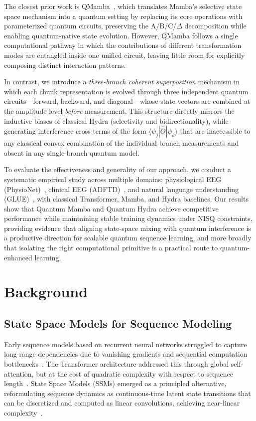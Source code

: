 \documentclass[conference]{IEEEtran}
\begin{document}
The closest prior work is QMamba~\cite{Stenzel2025}, which translates Mamba's selective state space mechanism into a quantum setting by replacing its core operations with parameterized quantum circuits, preserving the A/B/C/$\Delta$ decomposition while enabling quantum-native state evolution. However, QMamba follows a single computational pathway in which the contributions of different transformation modes are entangled inside one unified circuit, leaving little room for explicitly composing distinct interaction patterns.

In contrast, we introduce a \emph{three-branch coherent superposition} mechanism in which each chunk representation is evolved through three independent quantum circuits—forward, backward, and diagonal—whose state vectors are combined at the amplitude level \emph{before} measurement. This structure directly mirrors the inductive biases of classical Hydra (selectivity and bidirectionality), while generating interference cross-terms of the form $\langle\psi_j|\hat{O}|\psi_k\rangle$ that are inaccessible to any classical convex combination of the individual branch measurements and absent in any single-branch quantum model.

To evaluate the effectiveness and generality of our approach, we conduct a systematic empirical study across multiple domains: physiological EEG (PhysioNet)~\cite{schalk2004bci2000,goldberger2000physiobank}, clinical EEG (ADFTD)~\cite{miltiadous2023dataset}, and natural language understanding (GLUE)~\cite{Wang2018GLUE}, with classical Transformer, Mamba, and Hydra baselines. Our results show that Quantum Mamba and Quantum Hydra achieve competitive performance while maintaining stable training dynamics under NISQ constraints, providing evidence that aligning state-space mixing with quantum interference is a productive direction for scalable quantum sequence learning, and more broadly that isolating the right computational primitive is a practical route to quantum-enhanced learning.

\section{Background}

\subsection{State Space Models for Sequence Modeling}

Early sequence models based on recurrent neural networks struggled to capture long-range dependencies due to vanishing gradients and sequential computation bottlenecks~\cite{Hochreiter1997}. The Transformer architecture addressed this through global self-attention, but at the cost of quadratic complexity with respect to sequence length~\cite{Vaswani}. State Space Models (SSMs) emerged as a principled alternative, reformulating sequence dynamics as continuous-time latent state transitions that can be discretized and computed as linear convolutions, achieving near-linear complexity~\cite{Gu2021S4, Somvanshi2025SSMSurvey}.
\end{document}
